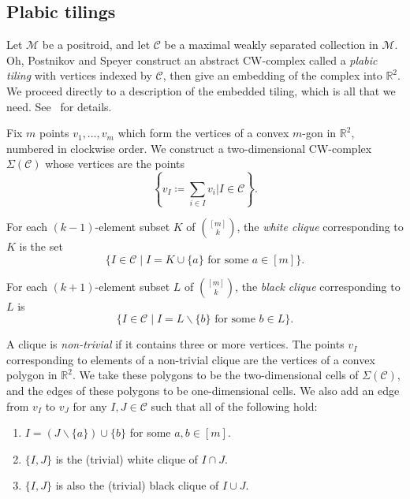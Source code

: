 \documentclass[10pt]{amsart}
\theoremstyle{definition}
\begin{document}
\subsection{Plabic tilings}

Let $\mathcal{M}$ be a positroid, and let $\mathcal{C}$ be a maximal weakly separated collection in $\mathcal{M}$. Oh, Postnikov and Speyer construct an abstract CW-complex called a \emph{plabic tiling} with vertices indexed by $\mathcal{C}$, then give an embedding of the complex into $\mathbb{R}^2$. We proceed directly to a description of the embedded tiling, which is all that we need. See~\cite[section 9]{OPS15} for details.

Fix $m$ points $v_1,\ldots,v_m$ which form the vertices of a convex $m$-gon in $\mathbb{R}^2$, numbered in clockwise order. We construct a two-dimensional CW-complex $\Sigma(\mathcal{C})$ whose vertices are the points 
\[\left\{v_I \coloneqq \sum_{i \in I} v_i \mathrel{\Bigg|} I \in \mathcal{C}\right\}.\]

For each $(k-1)$-element subset $K$ of $\binom{[m]}{k}$, the \emph{white clique} corresponding to $K$ is the set 
\[
\{I \in \mathcal{C} \mid I = K \cup \{a\} \text{ for some } a \in [m]\}.
\]

For each $(k+1)$-element subset $L$ of $\binom{[m]}{k}$, the \emph{black clique} corresponding to $L$ is \[\{I \in \mathcal{C} \mid I = L \backslash \{b\} \text{ for some } b \in L\}.\]

A clique is \emph{non-trivial} if it contains three or more vertices. The points $v_I$ corresponding to elements of a non-trivial clique are the vertices of a convex polygon in $\mathbb{R}^2$. We take these polygons to be the two-dimensional cells of $\Sigma(\mathcal{C})$, and the edges of these polygons to be one-dimensional cells.
We also add an edge from $v_I$ to $v_J$ for any $I, J \in \mathcal{C}$ such that all of the following hold:
\begin{enumerate}
\item $I = (J \backslash \{a\}) \cup \{b\}$ for some $a, b \in [m]$.
\item $\{I,J\}$ is the (trivial) white clique of $I \cap J.$
\item $\{I, J\}$ is also the (trivial) black clique of $I \cup J$.
\end{enumerate}
\end{document}

